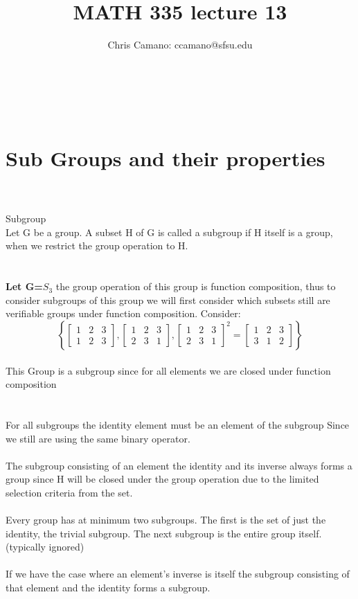 \documentclass[11pt]{article}
\author{Chris Camano: ccamano@sfsu.edu}
\title{MATH 335  lecture 13 }
\date
\theoremstyle{definition}  %
\newcommand{\bigline}{\\\noindent\makebox[\linewidth]{\rule{\paperwidth}{0.4pt}}\\}
\begin{document}
\maketitle
\bigline
\section{Sub Groups and their properties}
\bigline
{} Subgroup\\
Let G be a group. A subset H of G is called a subgroup if H itself is a group, when we restrict the group operation to H.\\ \bigline
\textbf{Let G=$S_3$} the group operation of this group is function composition, thus to consider subgroups of this group we will first consider which subsets still are verifiable groups under function composition.
Consider:
\[
\left\{
\begin{bmatrix}
  1&2&3\\
  1&2&3
\end{bmatrix},
\begin{bmatrix}
  1&2&3\\
  2&3&1
\end{bmatrix},
\begin{bmatrix}
  1&2&3\\
  2&3&1
\end{bmatrix}^2=\begin{bmatrix}
  1&2&3\\
  3&1&2
\end{bmatrix}
\right\}
\]\\
This Group is a subgroup since for all elements we are closed under function composition\\
\bigline
For all subgroups the identity element must be an element of the subgroup Since we still are using the same binary operator.\\\\
The subgroup consisting of an element the identity and its inverse always forms a group since H will be closed under the group operation due to the limited selection criteria from the set. \\\\
Every group has at minimum two subgroups. The first is the set of just the identity, the trivial subgroup. The next subgroup is the entire group itself. (typically ignored)\\\\
If we have the case where an element's inverse is itself the subgroup consisting of that element and the identity forms a subgroup.
\bigline
\end{document}
